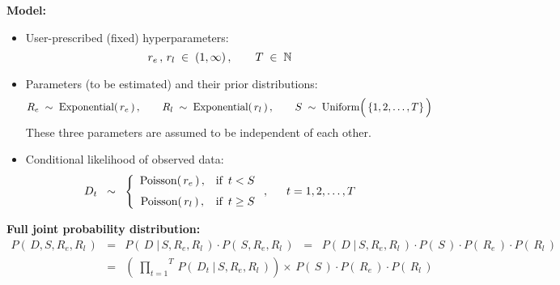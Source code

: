 \vskip 0.5cm
\noindent
\textbf{Model:}
\begin{itemize}
\item
	User-prescribed (fixed) hyperparameters:
	\begin{equation*}
	r_{e}\,,\, r_{l} \; \in \; (1,\infty)\,,
	\quad\quad
	T \; \in \; \mathbb{N}
	\end{equation*}
\item
	Parameters (to be estimated) and their prior distributions:
	\begin{equation*}
	R_{e} \;\sim\; \textnormal{Exponential}(\,r_{e}\,)\,,
	\quad\quad
	R_{l} \;\sim\; \textnormal{Exponential}(\,r_{l}\,)\,,
	\quad\quad
	S \;\sim\; \textnormal{Uniform}\!\left(\,\{\overset{{\color{white}.}}{1},2,\ldots,T\}\,\right)
	\end{equation*}
	These three parameters are assumed to be independent of each other.
\item
	Conditional likelihood of observed data:
	\begin{equation*}
	D_{t}
	\;\; \sim \;\;
		\left\{\begin{array}{ccc}
		\textnormal{Poisson}(\,r_{e}\,)\,, & \textnormal{if \,$t < S$}
		\\
		\overset{{\color{white}1}}{\textnormal{Poisson}(\,r_{l}\,)}\,, & \textnormal{if \,$t \geq S$}
		\end{array}\right.,
	\quad\;\;
	t = 1, 2, \ldots, T
	\end{equation*}
\end{itemize}


\vskip 0.5cm
\noindent
\textbf{Full joint probability distribution:}
\begin{eqnarray*}
P\!\left(\,D,S,R_{e},R_{l}\,\right)
& = &
	P\!\left(\,D \;\vert\, S,R_{e},R_{l}\,\right)
	\cdot
	P\!\left(\,S,R_{e},R_{l}\,\right)
\;\; = \;\;
	P\!\left(\,D \;\vert\, S,R_{e},R_{l}\,\right)
	\cdot
	P\!\left(\,S\,\right)
	\cdot
	P\!\left(\,R_{e}\,\right)
	\cdot
	P\!\left(\,R_{l}\,\right)
\\
& = &
	\left(\;
		\overset{T}{\underset{t=1}{\prod}}\,
		P\!\left(\,D_{t} \;\vert\, S,R_{e},R_{l}\,\right)
		\right)
	\times\,
	P\!\left(\,S\,\right)
	\cdot
	P\!\left(\,R_{e}\,\right)
	\cdot
	P\!\left(\,R_{l}\,\right)
\end{eqnarray*}


